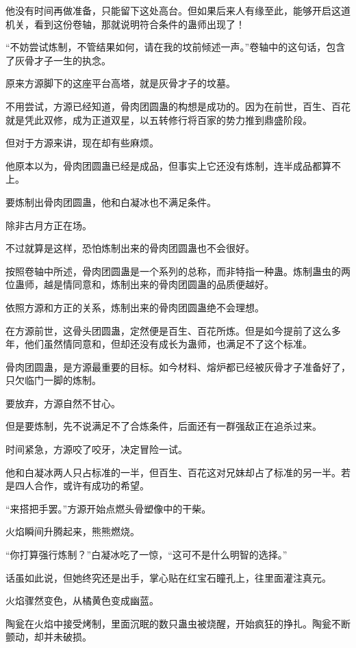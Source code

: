 \begin{this_body}
他没有时间再做准备，只能留下这处高台。但如果后来人有缘至此，能够开启这道机关，看到这份卷轴，那就说明符合条件的蛊师出现了！

“不妨尝试炼制，不管结果如何，请在我的坟前倾述一声。”卷轴中的这句话，包含了灰骨才子一生的执念。

原来方源脚下的这座平台高塔，就是灰骨才子的坟墓。

不用尝试，方源已经知道，骨肉团圆蛊的构想是成功的。因为在前世，百生、百花就是凭此双修，成为正道双星，以五转修行将百家的势力推到鼎盛阶段。

但对于方源来讲，现在却有些麻烦。

他原本以为，骨肉团圆蛊已经是成品，但事实上它还没有炼制，连半成品都算不上。

要炼制出骨肉团圆蛊，他和白凝冰也不满足条件。

除非古月方正在场。

不过就算是这样，恐怕炼制出来的骨肉团圆蛊也不会很好。

按照卷轴中所述，骨肉团圆蛊是一个系列的总称，而非特指一种蛊。炼制蛊虫的两位蛊师，越是情同意和，炼制出来的骨肉团圆蛊的品质便越好。

依照方源和方正的关系，炼制出来的骨肉团圆蛊绝不会理想。

在方源前世，这骨头团圆蛊，定然便是百生、百花所炼。但是如今提前了这么多年，他们虽然情同意和，但却还没有成长为蛊师，也满足不了这个标准。

骨肉团圆蛊，是方源最重要的目标。如今材料、熔炉都已经被灰骨才子准备好了，只欠临门一脚的炼制。

要放弃，方源自然不甘心。

但是要炼制，先不说满足不了合炼条件，后面还有一群强敌正在追杀过来。

时间紧急，方源咬了咬牙，决定冒险一试。

他和白凝冰两人只占标准的一半，但百生、百花这对兄妹却占了标准的另一半。若是四人合作，或许有成功的希望。

“来搭把手罢。”方源开始点燃头骨塑像中的干柴。

火焰瞬间升腾起来，熊熊燃烧。

“你打算强行炼制？”白凝冰吃了一惊，“这可不是什么明智的选择。”

话虽如此说，但她终究还是出手，掌心贴在红宝石瞳孔上，往里面灌注真元。

火焰骤然变色，从橘黄色变成幽蓝。

陶瓮在火焰中接受烤制，里面沉眠的数只蛊虫被烧醒，开始疯狂的挣扎。陶瓮不断颤动，却并未破损。


\end{this_body}
